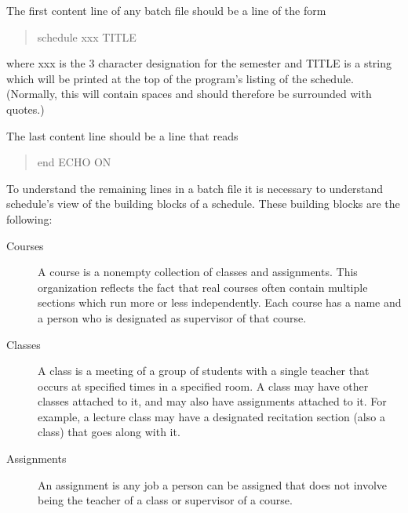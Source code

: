 The first content line of any batch file should be a line of the form
\begin{quote}

schedule xxx TITLE
\end{quote}
where xxx is the 3 character designation for the semester and TITLE is a
string which will be printed at the top of the program's listing of the
schedule. (Normally, this will contain spaces and should therefore be
surrounded with quotes.)

The last content line should be a line that reads
\begin{quote}
end ECHO ON
\end{quote}

To understand the remaining lines in a batch file it is necessary to understand
schedule's view of the building blocks of a schedule. These building blocks
are the following:
\begin{description}
\item [Courses] A course is a nonempty collection of classes and assignments.
This organization reflects the fact that real courses often contain multiple
sections which run more or less independently. Each course has a name and
a person who is designated as supervisor of that course.
\item [Classes] A class is a meeting of a group of students with a single
teacher that occurs at specified times in a specified room. A class may have
other classes attached to it, and may also have assignments attached to it.
For example, a lecture class may have a designated recitation section (also
a class) that goes along with it. 
\item [Assignments] An assignment is any job a person can be assigned that
does not involve being the teacher of a class or supervisor of a course. 
\end{description}

